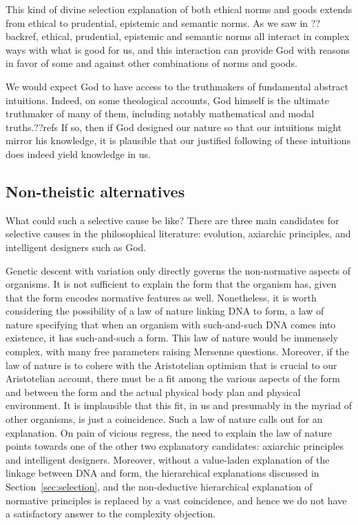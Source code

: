 This kind of divine selection explanation of both ethical norms and goods extends from ethical to prudential, epistemic and 
semantic norms. As we saw in ??backref, ethical, prudential, epistemic and semantic norms all interact in complex ways with 
what is good for us, and this interaction can provide God with reasons in favor of some and against other combinations of
norms and goods.

We would expect God to have access to the truthmakers of fundamental abstract intuitions. Indeed, on some theological accounts,
God himself is the ultimate truthmaker of many of them, including notably mathematical and modal truths.??refs If so, then 
if God designed our nature so that our intuitions might mirror his knowledge, it is plausible that our justified following of
these intuitions does indeed yield knowledge in us.

\subsection{Non-theistic alternatives}
What could such a selective cause be like? There are three main candidates for selective causes in the philosophical
literature: evolution, axiarchic principles, and intelligent designers such as God.  

Genetic descent with variation only directly governs the non-normative aspects of organisms. It is not sufficient to explain
the form that the organism has, given that the form encodes normative features as well. Nonetheless, it is worth considering
the possibility of a law of nature linking DNA to form, a law of nature specifying that when an organism with such-and-such 
DNA comes into existence, it has such-and-such a form. This law of nature would be immensely complex, with many free parameters
raising Mersenne questions. Moreover, if the law of nature is to cohere with the Aristotelian optimism that is crucial to our
Aristotelian account, there must be a fit among the various aspects of the form and between the form and the actual physical 
body plan and physical environment. It is implausible that this fit, in us and presumably in the myriad of other organisms,
is just a coincidence. Such a law of nature calls out for an explanation. On pain of vicious regress, the need to explain the 
law of nature points towards one of the other two explanatory candidates: axiarchic principles and intelligent designers.
Moreover, without a value-laden explanation of the linkage between DNA and form, the hierarchical explanations discussed 
in Section~\ref{sec:selection}, and the non-deductive hierarchical explanation of normative principles is replaced by a vast
coincidence, and hence we do not have a satisfactory answer to the complexity objection. 


